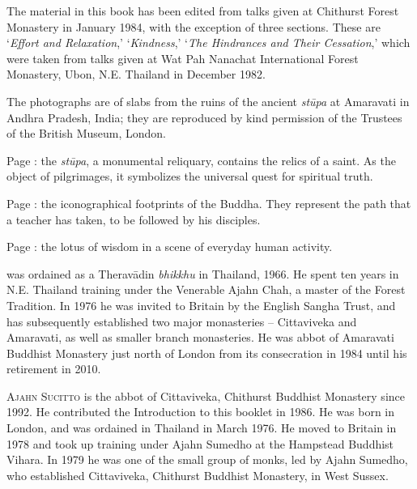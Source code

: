 
{\centering\par
\Large\scshape\chapTitleFont\thetitle
\par}
\vspace*{2\baselineskip}

{%
\setlength{\parskip}{1.5em}
\setlength{\parindent}{0pt}

The material in this book has been edited from talks given at Chithurst Forest Monastery in January 1984, with the exception of three sections. These are `\textit{Effort and Relaxation},' `\textit{Kindness},' `\textit{The Hindrances and Their Cessation},' which were taken from talks given at Wat Pah Nanachat International Forest Monastery, Ubon, N.E. Thailand in December 1982.

The photographs are of slabs from the ruins of the ancient \textit{stūpa} at Amaravati in Andhra Pradesh, India; they are reproduced by kind permission of the Trustees of the British Museum, London.

Page \pageref{image-stupa}: the \textit{stūpa}, a monumental reliquary, contains the relics of a saint. As the object of pilgrimages, it symbolizes the universal quest for spiritual truth.

Page \pageref{image-feet}: the iconographical footprints of the Buddha. They represent the path that a teacher has taken, to be followed by his disciples.

Page \pageref{image-lotus-scene}: the lotus of wisdom in a scene of everyday human activity.

\clearpage
\thispagestyle{empty}

{\scshape \theauthor} was ordained as a Therav\=adin \textit{bhikkhu} in Thailand, 1966. He spent ten years in N.E. Thailand training under the Venerable Ajahn Chah, a master of the Forest Tradition. In 1976 he was invited to Britain by the English Sangha Trust, and has subsequently established two major monasteries -- Cittaviveka and Amaravati, as well as smaller branch monasteries. He was abbot of Amaravati Buddhist Monastery just north of London from its consecration in 1984 until his retirement in 2010.

{\scshape Ajahn Sucitto} is the abbot of Cittaviveka, Chithurst Buddhist Monastery since 1992. He contributed the Introduction to this booklet in 1986. He was born in London, and was ordained in Thailand in March 1976. He moved to Britain in 1978 and took up training under Ajahn Sumedho at the Hampstead Buddhist Vihara. In 1979 he was one of the small group of monks, led by Ajahn Sumedho, who established Cittaviveka, Chithurst Buddhist Monastery, in West Sussex.


}


